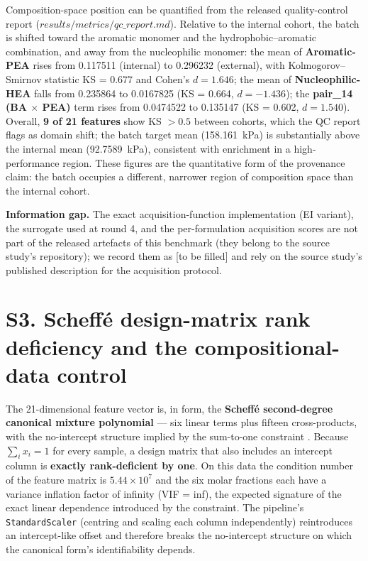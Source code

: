 \documentclass[utf8]{frontiers_suppmat}
\begin{document}
Composition-space position can be quantified from the released quality-control report ($results/metrics/qc\_report.md$). Relative to the internal cohort, the batch is shifted toward the aromatic monomer and the hydrophobic--aromatic combination, and away from the nucleophilic monomer: the mean of \textbf{Aromatic-PEA} rises from 0.117511 (internal) to 0.296232 (external), with Kolmogorov--Smirnov statistic KS = 0.677 and Cohen's $d = 1.646$; the mean of \textbf{Nucleophilic-HEA} falls from 0.235864 to 0.0167825 (KS = 0.664, $d = -1.436$); the \textbf{pair\_14 (BA $\times$ PEA)} term rises from 0.0474522 to 0.135147 (KS = 0.602, $d = 1.540$). Overall, \textbf{9 of 21 features} show KS $> 0.5$ between cohorts, which the QC report flags as domain shift; the batch target mean (158.161~kPa) is substantially above the internal mean (92.7589~kPa), consistent with enrichment in a high-performance region. These figures are the quantitative form of the provenance claim: the batch occupies a different, narrower region of composition space than the internal cohort.

\textbf{Information gap.} The exact acquisition-function implementation (EI variant), the surrogate used at round 4, and the per-formulation acquisition scores are not part of the released artefacts of this benchmark (they belong to the source study's repository); we record them as {[}to be filled{]} and rely on the source study's published description \cite{liao2025nature} for the acquisition protocol.

\section{S3. Scheff\'e design-matrix rank deficiency and the compositional-data control}

The 21-dimensional feature vector is, in form, the \textbf{Scheff\'e second-degree canonical mixture polynomial} --- six linear terms plus fifteen cross-products, with the no-intercept structure implied by the sum-to-one constraint \cite{scheffe1958,cornell2002}. Because $\sum_i x_i = 1$ for every sample, a design matrix that also includes an intercept column is \textbf{exactly rank-deficient by one}. On this data the condition number of the feature matrix is \textbf{$5.44 \times 10^7$} and the six molar fractions each have a variance inflation factor of infinity (VIF = inf), the expected signature of the exact linear dependence introduced by the constraint. The pipeline's \texttt{StandardScaler} (centring and scaling each column independently) reintroduces an intercept-like offset and therefore breaks the no-intercept structure on which the canonical form's identifiability depends.
\end{document}
